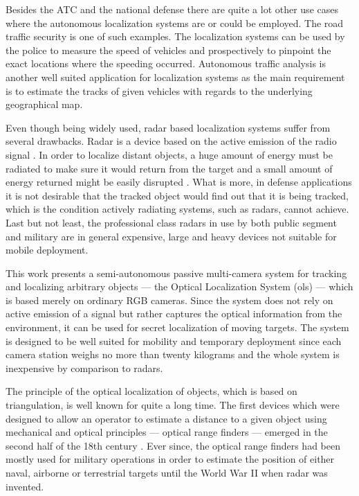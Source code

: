Besides the ATC and the national defense there are quite a lot other use cases where the autonomous localization systems are or could be employed. The road traffic security is one of such examples. The localization systems can be used by the police to measure the speed of vehicles and prospectively to pinpoint the exact locations where the speeding occurred. Autonomous traffic analysis is another well suited application for localization systems as the main requirement is to estimate the tracks of given vehicles with regards to the underlying geographical map.

Even though being widely used, radar based localization systems suffer from several drawbacks. Radar is a device based on the active emission of the radio signal \cite{toomay2012radar}. In order to localize distant objects, a huge amount of energy must be radiated to make sure it would return from the target and a small amount of energy returned might be easily disrupted \cite{Airtrafficmuseum}. What is more, in defense applications it is not desirable that the tracked object would find out that it is being tracked, which is the condition actively radiating systems, such as radars, cannot achieve. Last but not least, the professional class radars in use by both public segment and military are in general expensive, large and heavy devices not suitable for mobile deployment.

This work presents a semi-autonomous passive multi-camera system for tracking and localizing arbitrary objects --- the Optical Localization System (\gls{ols}) --- which is based merely on ordinary RGB cameras. Since the system does not rely on active emission of a signal but rather captures the optical information from the environment, it can be used for secret localization of moving targets. The system is designed to be well suited for mobility and temporary deployment since each camera station weighs no more than twenty kilograms and the whole system is inexpensive by comparison to radars.

The principle of the optical localization of objects, which is based on triangulation, is well known for quite a long time. The first devices which were designed to allow an operator to estimate a distance to a given object using mechanical and optical principles --- optical range finders --- emerged in the second half of the 18th century \cite{bud1998instruments}. Ever since, the optical range finders had been mostly used for military operations in order to estimate the position of either naval, airborne or terrestrial targets until the World War II when radar was invented.

